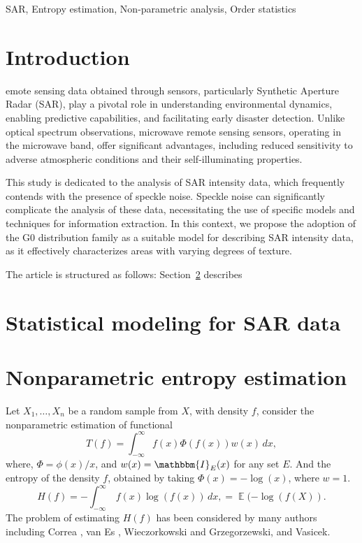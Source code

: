 \documentclass[conference]{IEEEtran}
\DeclareMathOperator{\EX}{\mathbb{E}}%
\begin{document}
\begin{IEEEkeywords}
SAR, Entropy estimation, Non-parametric analysis, Order statistics
\end{IEEEkeywords}

\section{Introduction}\label{sec_01}

emote sensing data obtained through sensors, particularly Synthetic Aperture Radar (SAR), play a pivotal role in understanding environmental dynamics, enabling predictive capabilities, and facilitating early disaster detection. Unlike optical spectrum observations, microwave remote sensing sensors, operating in the microwave band, offer significant advantages, including reduced sensitivity to adverse atmospheric conditions and their self-illuminating properties.

This study is dedicated to the analysis of SAR intensity data, which frequently contends with the presence of speckle noise. Speckle noise can significantly complicate the analysis of these data, necessitating the use of specific models and techniques for information extraction. In this context, we propose the adoption of the G0 distribution family as a suitable model for describing SAR intensity data, as it effectively characterizes areas with varying degrees of texture.

The article is structured as follows: 
Section~\ref{sec_02} describes 

\section{Statistical modeling for SAR data}\label{sec_02}



\section{Nonparametric entropy estimation}


Let $X_1,\ldots,X_n$ be a random sample from $X$, with density $f$, consider the nonparametric estimation of functional
\begin{equation}
  \label{E:entropy1}
  T(f)=\int_{-\infty }^\infty \!\! f(x)\Phi(f(x))w(x)\,dx,
\end{equation}
where, $\Phi=\phi(x)/x$, and $w(x)= \mathbbm{I}_E(x)$ for any set $E$.
And the entropy of the density $f$, obtained by taking $\Phi(x)=-\log (x)$, where $w=1$.
\begin{equation}
  \label{E:entropy2}
  H(f)=-\int_{-\infty }^\infty \ f(x)\log(f(x))\,dx,=\EX(-\log(f(X)).
\end{equation}
The problem of estimating $H(f)$ has been considered by many authors including
Correa \cite{correa1995new}, van Es \cite{van1992}, Wieczorkowski and Grzegorzewski, and Vasicek.
\end{document}
